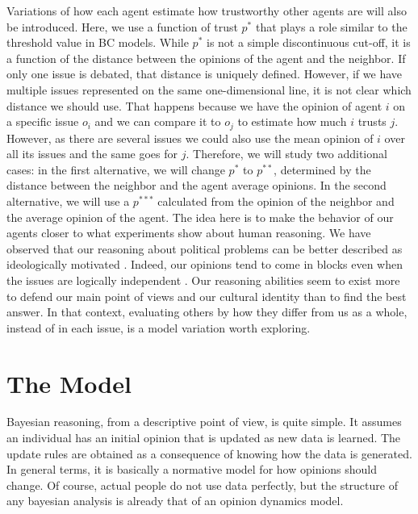 \documentclass{article}
\begin{document}
Variations of how each agent estimate how trustworthy other agents are will also
be introduced. Here, we use a function of trust $p^*$ that plays a role similar
to the threshold value in BC models. While $p^*$ is not a simple discontinuous
cut-off, it is a function of the distance between the opinions of the agent and
the neighbor. If only one issue is debated, that distance is uniquely defined.
However, if we have multiple issues represented on the same one-dimensional
line, it is not clear which distance we should use. That happens because we have
the opinion of agent $i$ on a specific issue $o_i$ and we can compare it to
$o_j$ to estimate how much $i$ trusts $j$. However, as there are several issues
we could also use the mean opinion of $i$ over all its issues and the same goes
for $j$. Therefore, we will study two additional cases: in the first
alternative, we will change \(p^*\) to \(p^{**}\), determined by the distance
between the neighbor and the agent average opinions. In the second alternative,
we will use a \(p^{***}\) calculated from the opinion of the neighbor and the
average opinion of the agent. The idea here is to make the behavior of our
agents closer to what experiments show about human reasoning. We have observed
that our reasoning about political problems can be better described as
ideologically motivated \cite{jostetal03a,taberlodge06a,Claassen2015a}. Indeed,
our opinions tend to come in blocks even when the issues are logically
independent \cite{jervis76a}. Our reasoning abilities seem to exist more to
defend our main point of views \cite{mercier11a,merciersperber11a} and our
cultural identity \cite{kahanetal11} than to find the best answer. In that
context, evaluating others by how they differ from us as a whole, instead of in
each issue, is a model variation worth exploring.

\section{The Model}

Bayesian reasoning, from a descriptive point of view, is quite simple. It assumes an individual has an initial opinion that is updated as new data is learned. The update rules are obtained as a consequence of knowing how the data is generated. In general terms, it is basically a normative model for how opinions should change. Of course, actual people do not use data perfectly, but the structure of any bayesian analysis is already that of an opinion dynamics model.
\end{document}

